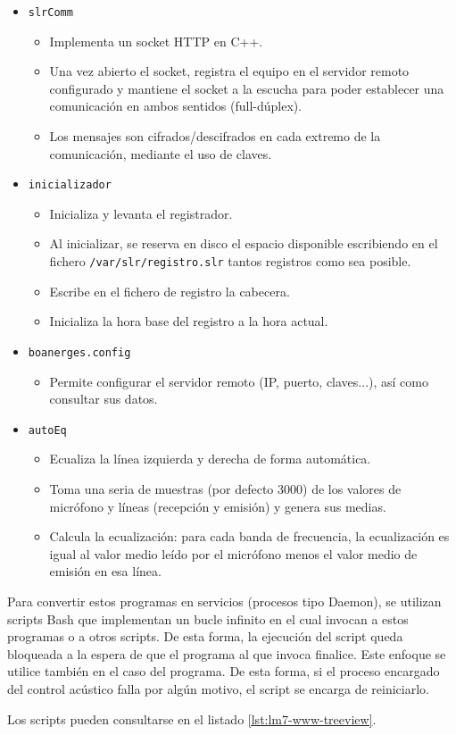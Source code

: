 \begin{itemize}
    \item \verb|slrComm|
    \begin{itemize}
        \item Implementa un socket HTTP en C++.
        \item Una vez abierto el socket, registra el equipo en el servidor remoto configurado y mantiene el socket a la escucha para poder establecer una comunicación en ambos sentidos (full-dúplex).
        \item Los mensajes son cifrados/descifrados en cada extremo de la comunicación, mediante el uso de claves.
    \end{itemize}

    \item \verb|inicializador|
    \begin{itemize}
        \item Inicializa y levanta el registrador.
        \item Al inicializar, se reserva en disco el espacio disponible escribiendo en el fichero \verb|/var/slr/registro.slr| tantos registros como sea posible.
        \item Escribe en el fichero de registro la cabecera.
        \item Inicializa la hora base del registro a la hora actual.
    \end{itemize}

    \item \verb|boanerges.config|
    \begin{itemize}
        \item Permite configurar el servidor remoto (IP, puerto, claves...), así como consultar sus datos.
    \end{itemize}

    \item \verb|autoEq|
    \begin{itemize}
        \item Ecualiza la línea izquierda y derecha de forma automática.
        \item Toma una seria de muestras (por defecto 3000) de los valores de micrófono y líneas (recepción y emisión) y genera sus medias.
        \item Calcula la ecualización: para cada banda de frecuencia, la ecualización es igual al valor medio leído por el micrófono menos el valor medio de emisión en esa línea.
    \end{itemize}

\end{itemize}

Para convertir estos programas en servicios (procesos tipo Daemon), se utilizan scripts Bash que implementan un bucle infinito en el cual invocan a estos programas o a otros scripts. De esta forma, la ejecución del script queda bloqueada a la espera de que el programa al que invoca finalice. Este enfoque se utilice también en el caso del programa. De esta forma, si el proceso encargado del control acústico falla por algún motivo, el script se encarga de reiniciarlo.

Los scripts pueden consultarse en el listado \ref{lst:lm7-www-treeview}.